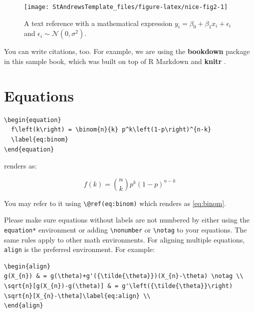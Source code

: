 \documentclass[
  british,
  oneside]{krantz}
\theoremstyle{definition}
\theoremstyle{definition}
\theoremstyle{definition}
\theoremstyle{definition}
\theoremstyle{remark}
\begin{document}
\begin{figure}

{\centering \texttt{[image: StAndrewsTemplate\_files/figure-latex/nice-fig2-1]} 

}

\caption{A text reference with a mathematical expression \(y_i=\beta_0 + \beta_1x_i + \epsilon_i\) and \(\epsilon_i \sim \mathcal{N}(0, \sigma^2)\).}\label{fig:nice-fig2}
\end{figure}

You can write citations, too. For example, we are using the \textbf{bookdown} package \citep{R-bookdown} in this sample book, which was built on top of R Markdown and \textbf{knitr} \citep{xie2015}.

\hypertarget{equations}{%
\section{Equations}\label{equations}}

\begin{verbatim}
\begin{equation} 
  f\left(k\right) = \binom{n}{k} p^k\left(1-p\right)^{n-k}
  \label{eq:binom}
\end{equation} 
\end{verbatim}

renders as:

\begin{equation} 
  f\left(k\right) = \binom{n}{k} p^k\left(1-p\right)^{n-k}
  \label{eq:binom}
\end{equation}

You may refer to it using \texttt{\textbackslash{}@ref(eq:binom)} which renders as \eqref{eq:binom}.

Please make sure equations  without labels are not numbered by either using the \texttt{equation*} environment or adding \texttt{\textbackslash{}nonumber} or \texttt{\textbackslash{}notag} to your equations. The same rules apply to other math environments. For aligning multiple equations, \texttt{align} is the preferred environment. For example: 

\begin{verbatim}
\begin{align} 
g(X_{n}) & = g(\theta)+g'({\tilde{\theta}})(X_{n}-\theta) \notag \\
\sqrt{n}[g(X_{n})-g(\theta)] & = g'\left({\tilde{\theta}}\right) 
\sqrt{n}[X_{n}-\theta]\label{eq:align} \\
\end{align} 
\end{verbatim}
\end{document}
